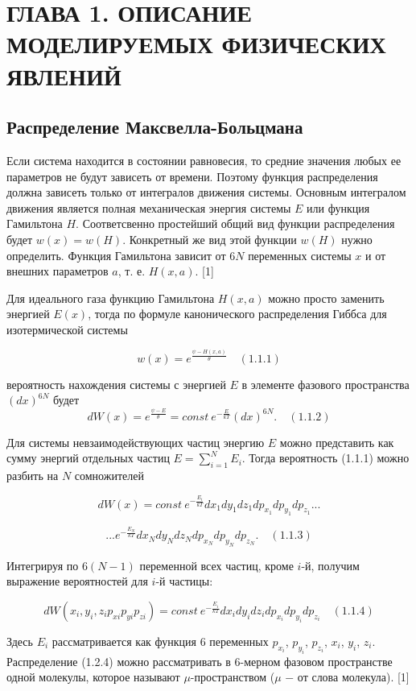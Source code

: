 \chapter{ГЛАВА 1. ОПИСАНИЕ МОДЕЛИРУЕМЫХ ФИЗИЧЕСКИХ ЯВЛЕНИЙ}
\label{ch:chapter1}

\section{Распределение Максвелла-Больцмана}
Если система находится в состоянии равновесия, то средние значения любых ее параметров не будут зависеть от времени. Поэтому функция распределения должна зависеть только от интегралов движения системы. Основным интегралом движения является полная механическая энергия системы $E$ или функция Гамильтона $H$. Соответсвенно простейший общий вид функции распределения будет $w(x)=w(H)$. Конкретный же вид этой функции $w(H)$ нужно определить. Функция Гамильтона зависит от $6N$ переменных системы $x$ и от внешних параметров $a$, т. е. $H(x,a)$. [1]

Для идеального газа функцию  Гамильтона $H(x,a)$ можно просто заменить энергией $E(x)$, тогда по формуле канонического распределения Гиббса для изотермической системы

$$w(x)=e^{\frac{\psi - H(x, a)}{\theta}} \quad (1.1.1)$$

вероятность нахождения системы с энергией $E$ в элементе фазового пространства $(dx)^{6N}$ будет
$$dW(x)=e^{\frac{\psi - E}{\theta}}=const \: e^{-\frac{E}{kT}}(dx)^{6N}. \quad (1.1.2)$$

Для системы невзаимодействующих частиц энергию $E$ можно представить как сумму энергий отдельных частиц $E=\sum_{i=1}^{N} E_i$. Тогда вероятность (1.1.1) можно разбить на $N$ сомножителей

$$dW(x)=const \: e^{-\frac{E_i}{kT}}dx_1dy_1dz_1dp_{x_1}dp_{y_1}dp_{z_1}...$$

$$...e^{-\frac{E_N}{kT}}dx_Ndy_Ndz_Ndp_{x_N}dp_{y_N}dp_{z_N}. \quad (1.1.3)$$

Интегрируя по $6(N-1)$ переменной всех частиц, кроме $i$-й, получим выражение вероятностей для $i$-й частицы:

$$dW(x_i,y_i,z_ip_{xi}p_{yi}p_{zi})=const \: e^{-\frac{E_i}{kT}}dx_idy_idz_idp_{x_i}dp_{y_i}dp_{z_i} \quad (1.1.4)$$

Здесь $E_i$ рассматривается как функция $6$ переменных $p_{x_i}$, $p_{y_i}$, $p_{z_i}$, $x_i$, $y_i$, $z_i$. Распределение (1.2.4) можно рассматривать в $6$-мерном фазовом пространстве одной молекулы, которое называют $\mu$-пространством ($\mu$ $-$ от слова молекула). [1]

